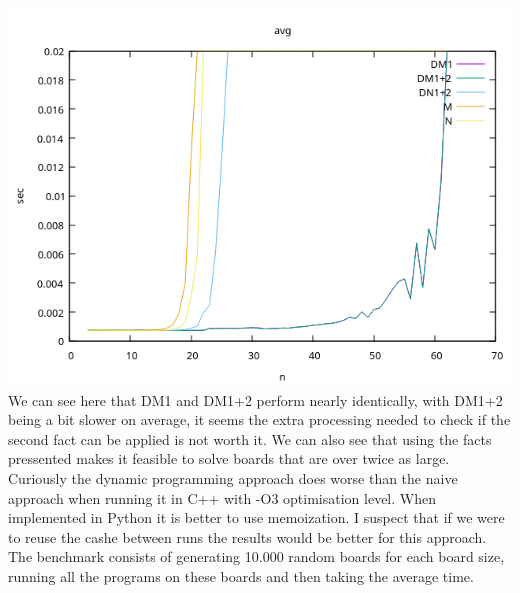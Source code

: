 \documentclass{article}
\begin{document}
\includegraphics[width=\textwidth]{./cpp_comparison}
We can see here that DM1 and DM1+2 perform nearly identically, with DM1+2 being a bit slower on average, it seems the extra processing needed to check if the second fact can be applied is not worth it. We can also see that using the facts pressented makes it feasible to solve boards that are over twice as large. 
Curiously the dynamic programming approach does worse than the naive approach when running it in C++ with -O3 optimisation level. When implemented in Python it is better to use memoization. I suspect that if we were to reuse the cashe between runs the results would be better for this approach. 
The benchmark consists of generating 10.000 random boards for each board size, running all the programs on these boards and then taking the average time. 
\end{document}

